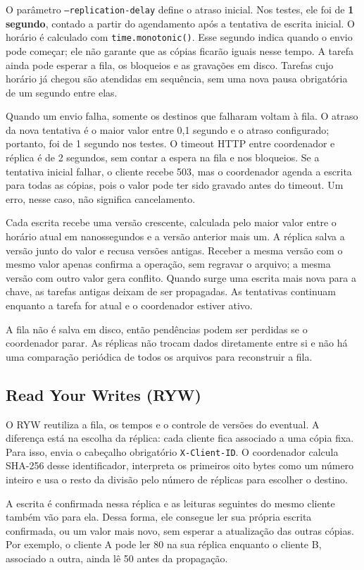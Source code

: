 O parâmetro \texttt{--replication-delay} define o atraso inicial. Nos testes,
ele foi de \textbf{1 segundo}, contado a partir do agendamento após a tentativa
de escrita inicial. O horário é calculado com \texttt{time.monotonic()}.
Esse segundo indica quando o envio pode começar; ele não garante que as
cópias ficarão iguais nesse tempo. A tarefa ainda pode esperar a fila,
os bloqueios e as gravações em disco. Tarefas cujo horário já chegou são
atendidas em sequência, sem uma nova pausa obrigatória de um segundo entre elas.

Quando um envio falha, somente os destinos que falharam voltam à fila.
O atraso da nova tentativa é o maior valor entre 0,1 segundo e o atraso
configurado; portanto, foi de 1 segundo nos testes. O timeout HTTP entre
coordenador e réplica é de 2 segundos, sem contar a espera na fila e nos
bloqueios. Se a tentativa inicial falhar, o cliente recebe 503, mas o
coordenador agenda a escrita para todas as cópias, pois o valor pode ter sido
gravado antes do timeout. Um erro, nesse caso, não significa cancelamento.

Cada escrita recebe uma versão crescente, calculada pelo maior valor entre
o horário atual em nanossegundos e a versão anterior mais um. A réplica
salva a versão junto do valor e recusa versões antigas. Receber a mesma
versão com o mesmo valor apenas confirma a operação, sem regravar o arquivo;
a mesma versão com outro valor gera conflito. Quando surge uma escrita mais
nova para a chave, as tarefas antigas deixam de ser propagadas. As tentativas
continuam enquanto a tarefa for atual e o coordenador estiver ativo.

A fila não é salva em disco, então pendências podem ser perdidas se o
coordenador parar. As réplicas não trocam dados diretamente entre si e não
há uma comparação periódica de todos os arquivos para reconstruir a fila.

\subsection{Read Your Writes (RYW)}
O RYW reutiliza a fila, os tempos e o controle de versões do eventual.
A diferença está na escolha da réplica: cada cliente fica associado a uma
cópia fixa. Para isso, envia o cabeçalho obrigatório \texttt{X-Client-ID}.
O coordenador calcula SHA-256 desse identificador, interpreta os primeiros
oito bytes como um número inteiro e usa o resto da divisão pelo número de
réplicas para escolher o destino.

A escrita é confirmada nessa réplica e as leituras seguintes do mesmo cliente
também vão para ela. Dessa forma, ele consegue ler sua própria escrita
confirmada, ou um valor mais novo, sem esperar a atualização das outras cópias.
Por exemplo, o cliente A pode ler 80 na sua réplica enquanto o cliente B,
associado a outra, ainda lê 50 antes da propagação.

